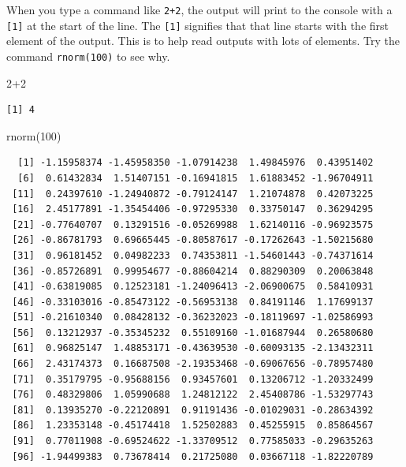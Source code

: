 \documentclass[
  13,
  letterpaper,
]{report}
\newenvironment{Shaded}{\begin{snugshade}}{\end{snugshade}}
\newcommand{\DecValTok}[1]{\textcolor[rgb]{0.68,0.00,0.00}{#1}}
\newcommand{\FunctionTok}[1]{\textcolor[rgb]{0.28,0.35,0.67}{#1}}
\newcommand{\NormalTok}[1]{\textcolor[rgb]{0.00,0.23,0.31}{#1}}
\newcommand{\SpecialCharTok}[1]{\textcolor[rgb]{0.37,0.37,0.37}{#1}}
\begin{document}
When you type a command like \texttt{2+2}, the output will print to the
console with a \texttt{{[}1{]}} at the start of the line. The
\texttt{{[}1{]}} signifies that that line starts with the first element
of the output. This is to help read outputs with lots of elements. Try
the command \texttt{rnorm(100)} to see why.

\begin{Shaded}
\begin{Highlighting}[]
\DecValTok{2}\SpecialCharTok{+}\DecValTok{2}
\end{Highlighting}
\end{Shaded}

\begin{verbatim}
[1] 4
\end{verbatim}

\begin{Shaded}
\begin{Highlighting}[]
\FunctionTok{rnorm}\NormalTok{(}\DecValTok{100}\NormalTok{)}
\end{Highlighting}
\end{Shaded}

\begin{verbatim}
  [1] -1.15958374 -1.45958350 -1.07914238  1.49845976  0.43951402
  [6]  0.61432834  1.51407151 -0.16941815  1.61883452 -1.96704911
 [11]  0.24397610 -1.24940872 -0.79124147  1.21074878  0.42073225
 [16]  2.45177891 -1.35454406 -0.97295330  0.33750147  0.36294295
 [21] -0.77640707  0.13291516 -0.05269988  1.62140116 -0.96923575
 [26] -0.86781793  0.69665445 -0.80587617 -0.17262643 -1.50215680
 [31]  0.96181452  0.04982233  0.74353811 -1.54601443 -0.74371614
 [36] -0.85726891  0.99954677 -0.88604214  0.88290309  0.20063848
 [41] -0.63819085  0.12523181 -1.24096413 -2.06900675  0.58410931
 [46] -0.33103016 -0.85473122 -0.56953138  0.84191146  1.17699137
 [51] -0.21610340  0.08428132 -0.36232023 -0.18119697 -1.02586993
 [56]  0.13212937 -0.35345232  0.55109160 -1.01687944  0.26580680
 [61]  0.96825147  1.48853171 -0.43639530 -0.60093135 -2.13432311
 [66]  2.43174373  0.16687508 -2.19353468 -0.69067656 -0.78957480
 [71]  0.35179795 -0.95688156  0.93457601  0.13206712 -1.20332499
 [76]  0.48329806  1.05990688  1.24812122  2.45408786 -1.53297743
 [81]  0.13935270 -0.22120891  0.91191436 -0.01029031 -0.28634392
 [86]  1.23353148 -0.45174418  1.52502883  0.45255915  0.85864567
 [91]  0.77011908 -0.69524622 -1.33709512  0.77585033 -0.29635263
 [96] -1.94499383  0.73678414  0.21725080  0.03667118 -1.82220789
\end{verbatim}
\end{document}
